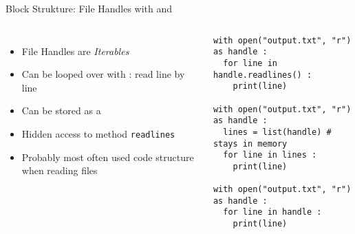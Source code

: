 \begin{frame}[fragile]{Block Strukture: File Handles with  and }
%
\begin{columns}[T]
\begin{itemize}
\item File Handles are \emph{Iterables}
\item Can be looped over with : read line by line
\item Can be stored as a  
\item Hidden access to method \texttt{readlines}
\item Probably most often used code structure when reading files
\end{itemize}
%
\begin{codebox}
\begin{verbatim}
with open("output.txt", "r") as handle :
  for line in handle.readlines() :
    print(line)

with open("output.txt", "r") as handle :
  lines = list(handle) # stays in memory
  for line in lines :
    print(line)

with open("output.txt", "r") as handle :
  for line in handle :
    print(line)
\end{verbatim}
\end{codebox}
%
\end{columns}
%
\end{frame}


